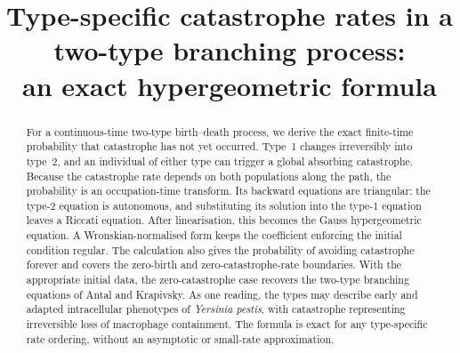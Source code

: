 \documentclass[11pt]{article}
\title{Type-specific catastrophe rates in a two-type branching process:\\
an exact hypergeometric formula}
\author{}
\date{}
\theoremstyle{plain}
\theoremstyle{definition}
\theoremstyle{remark}
\begin{document}
\maketitle
\vspace{-2.5em}

\begin{abstract}
For a continuous-time two-type birth--death process, we derive the exact finite-time probability that catastrophe has not yet occurred. Type~1 changes irreversibly into type~2, and an individual of either type can trigger a global absorbing catastrophe. Because the catastrophe rate depends on both populations along the path, the probability is an occupation-time transform. Its backward equations are triangular: the type-2 equation is autonomous, and substituting its solution into the type-1 equation leaves a Riccati equation. After linearisation, this becomes the Gauss hypergeometric equation. A Wronskian-normalised form keeps the coefficient enforcing the initial condition regular. The calculation also gives the probability of avoiding catastrophe forever and covers the zero-birth and zero-catastrophe-rate boundaries. With the appropriate initial data, the zero-catastrophe case recovers the two-type branching equations of Antal and Krapivsky. As one reading, the types may describe early and adapted intracellular phenotypes of \textit{Yersinia pestis}, with catastrophe representing irreversible loss of macrophage containment. The formula is exact for any type-specific rate ordering, without an asymptotic or small-rate approximation.
\end{abstract}

\tableofcontents









\FloatBarrier
\begingroup
\footnotesize


\endgroup
\end{document}
